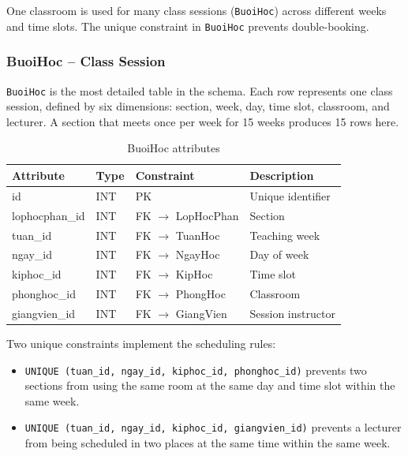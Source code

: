\documentclass[12pt,a4paper]{report}
\begin{document}
One classroom is used for many class sessions (\texttt{BuoiHoc}) across different weeks and time slots. The unique constraint in \texttt{BuoiHoc} prevents double-booking.

\subsubsection{BuoiHoc -- Class Session}

\texttt{BuoiHoc} is the most detailed table in the schema. Each row represents one class session, defined by six dimensions: section, week, day, time slot, classroom, and lecturer. A section that meets once per week for 15 weeks produces 15 rows here.

\begin{table}[H]
\renewcommand{\arraystretch}{1.35}
\caption{BuoiHoc attributes}
\label{tab:buoihoc}
\begin{tabular}{|p{3.5cm}|p{2.5cm}|p{2.5cm}|p{5cm}|}
  \hline
  \textbf{Attribute} & \textbf{Type} & \textbf{Constraint} & \textbf{Description} \\
  \hline
  id & INT & PK & Unique identifier \\
  \hline
  lophocphan\_id & INT & FK $\to$ LopHocPhan & Section \\
  \hline
  tuan\_id & INT & FK $\to$ TuanHoc & Teaching week \\
  \hline
  ngay\_id & INT & FK $\to$ NgayHoc & Day of week \\
  \hline
  kiphoc\_id & INT & FK $\to$ KipHoc & Time slot \\
  \hline
  phonghoc\_id & INT & FK $\to$ PhongHoc & Classroom \\
  \hline
  giangvien\_id & INT & FK $\to$ GiangVien & Session instructor \\
  \hline
\end{tabular}
\end{table}

Two unique constraints implement the scheduling rules:

\begin{itemize}
  \item \texttt{UNIQUE (tuan\_id, ngay\_id, kiphoc\_id, phonghoc\_id)} prevents two sections from using the same room at the same day and time slot within the same week.
  \item \texttt{UNIQUE (tuan\_id, ngay\_id, kiphoc\_id, giangvien\_id)} prevents a lecturer from being scheduled in two places at the same time within the same week.
\end{itemize}
\end{document}
